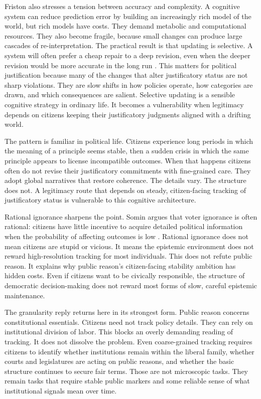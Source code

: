 \documentclass[12pt]{article}
\begin{document}
Friston also stresses a tension between accuracy and complexity. A cognitive system can reduce prediction error by building an increasingly rich model of the world, but rich models have costs. They demand metabolic and computational resources. They also become fragile, because small changes can produce large cascades of re-interpretation. The practical result is that updating is selective. A system will often prefer a cheap repair to a deep revision, even when the deeper revision would be more accurate in the long run \parencite[p.~128]{friston2010freeenergy}. This matters for political justification because many of the changes that alter justificatory status are not sharp violations. They are slow shifts in how policies operate, how categories are drawn, and which consequences are salient. Selective updating is a sensible cognitive strategy in ordinary life. It becomes a vulnerability when legitimacy depends on citizens keeping their justificatory judgments aligned with a drifting world.


The pattern is familiar in political life. Citizens experience long periods in which the meaning of a principle seems stable, then a sudden crisis in which the same principle appears to license incompatible outcomes. When that happens citizens often do not revise their justificatory commitments with fine-grained care. They adopt global narratives that restore coherence. The details vary. The structure does not. A legitimacy route that depends on steady, citizen-facing tracking of justificatory status is vulnerable to this cognitive architecture.

Rational ignorance sharpens the point. Somin argues that voter ignorance is often rational: citizens have little incentive to acquire detailed political information when the probability of affecting outcomes is low \parencite[p.~77]{somin2013democracy}. Rational ignorance does not mean citizens are stupid or vicious. It means the epistemic environment does not reward high-resolution tracking for most individuals. This does not refute public reason. It explains why public reason's citizen-facing stability ambition has hidden costs. Even if citizens want to be civically responsible, the structure of democratic decision-making does not reward most forms of slow, careful epistemic maintenance.

The granularity reply returns here in its strongest form. Public reason concerns constitutional essentials. Citizens need not track policy details. They can rely on institutional division of labor. This blocks an overly demanding reading of tracking. It does not dissolve the problem. Even coarse-grained tracking requires citizens to identify whether institutions remain within the liberal family, whether courts and legislatures are acting on public reasons, and whether the basic structure continues to secure fair terms. Those are not microscopic tasks. They remain tasks that require stable public markers and some reliable sense of what institutional signals mean over time.
\end{document}
